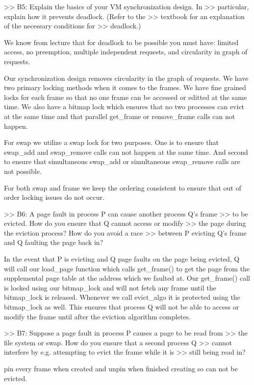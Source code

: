 >> B5: Explain the basics of your VM synchronization design.  In
>> particular, explain how it prevents deadlock.  (Refer to the
>> textbook for an explanation of the necessary conditions for
>> deadlock.)

We know from lecture that for deadlock to be possible you must have: limited 
access, no preemption, multiple independent requests, and circularity in 
graph of requests. 

Our synchronization design removes circularity in the graph of requests.
We have two primary locking methods when it comes to the frames. We have
fine grained locks for each frame so that no one frame can be accessed
or editted at the same time. We also have a bitmap lock which ensures that
no two processes can evict at the same time and that parallel get_frame
or remove_frame calls can not happen. 

For swap we utilize a swap lock for two purposes. One is to ensure that
swap_add and swap_remove calls can not happen at the same time. And second
to ensure that simultaneous swap_add or simultaneous swap_remove calls
are not possible. 

For both swap and frame we keep the ordering consistent
to ensure that out of order locking issues do not occur. 

>> B6: A page fault in process P can cause another process Q's frame
>> to be evicted.  How do you ensure that Q cannot access or modify
>> the page during the eviction process?  How do you avoid a race
>> between P evicting Q's frame and Q faulting the page back in?

In the event that P is evicting and Q page faults on the page being evicted,
Q will call our load_page function which calls get_frame() to get the page
from the supplemental page table at the address which we faulted at. 
Our get_frame() call is locked using our bitmap_lock and will not fetch 
any frame until the bitmap_lock is released. Whenever we call evict_algo 
it is protected using the bitmap_lock as well. This ensures that process 
Q will not be able to access or modify the frame until after the eviction 
algorithm completes. 

>> B7: Suppose a page fault in process P causes a page to be read from
>> the file system or swap.  How do you ensure that a second process Q
>> cannot interfere by e.g. attempting to evict the frame while it is
>> still being read in?

pin every frame when created and unpin when finished creating so can not be
evicted. 

